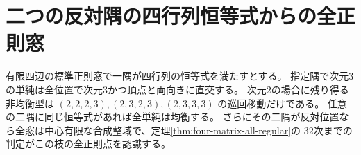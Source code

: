 \section{二つの反対隅の四行列恒等式からの全正則窓}
\label{sec:opposite-four-matrix-corners}
\begin{theorem}\label{thm:opposite-four-matrix-corners}
有限四辺の標準正則窓で一隅が四行列の恒等式を満たすとする。
指定隅で次元3の単純は全位置で次元3かつ頂点と両向きに直交する。
次元2の場合に残り得る非均衡型は $(2,2,2,3),(2,3,2,3),(2,3,3,3)$ の巡回移動だけである。
任意の二隅に同じ恒等式があれば全単純は均衡する。
さらにその二隅が反対位置なら全窓は中心有限な合成整域で、定理\ref{thm:four-matrix-all-regular}の
32次までの判定がこの枝の全正則点を認識する。
\end{theorem}

